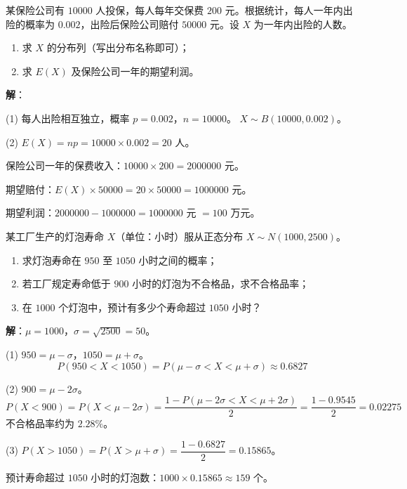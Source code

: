 \documentclass[12pt, a4paper]{ctexart}
\begin{document}
\begin{appbox}[【应用1】保险精算]
某保险公司有 $10000$ 人投保，每人每年交保费 $200$ 元。根据统计，每人一年内出险的概率为 $0.002$，出险后保险公司赔付 $50000$ 元。设 $X$ 为一年内出险的人数。
\begin{enumerate}[label=(\arabic*)]
  \item 求 $X$ 的分布列（写出分布名称即可）；
  \item 求 $E(X)$ 及保险公司一年的期望利润。
\end{enumerate}
\end{appbox}

\textbf{解}：

(1) 每人出险相互独立，概率 $p = 0.002$，$n = 10000$。
$X \sim B(10000, 0.002)$。

(2) $E(X) = np = 10000 \times 0.002 = 20$ 人。

保险公司一年的保费收入：$10000 \times 200 = 2000000$ 元。

期望赔付：$E(X) \times 50000 = 20 \times 50000 = 1000000$ 元。

期望利润：$2000000 - 1000000 = 1000000$ 元 $= 100$ 万元。

\begin{appbox}[【应用2】质量控制]
某工厂生产的灯泡寿命 $X$（单位：小时）服从正态分布 $X \sim N(1000, 2500)$。
\begin{enumerate}[label=(\arabic*)]
  \item 求灯泡寿命在 $950$ 至 $1050$ 小时之间的概率；
  \item 若工厂规定寿命低于 $900$ 小时的灯泡为不合格品，求不合格品率；
  \item 在 $1000$ 个灯泡中，预计有多少个寿命超过 $1050$ 小时？
\end{enumerate}
\end{appbox}

\textbf{解}：$\mu = 1000$，$\sigma = \sqrt{2500} = 50$。

(1) $950 = \mu - \sigma$，$1050 = \mu + \sigma$。
\[
P(950 < X < 1050) = P(\mu - \sigma < X < \mu + \sigma) \approx 0.6827
\]

(2) $900 = \mu - 2\sigma$。
\[
P(X < 900) = P(X < \mu - 2\sigma) = \frac{1 - P(\mu - 2\sigma < X < \mu + 2\sigma)}{2} = \frac{1 - 0.9545}{2} = 0.02275
\]
不合格品率约为 $2.28\%$。

(3) $P(X > 1050) = P(X > \mu + \sigma) = \dfrac{1 - 0.6827}{2} = 0.15865$。

预计寿命超过 $1050$ 小时的灯泡数：$1000 \times 0.15865 \approx 159$ 个。
\end{document}
